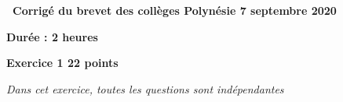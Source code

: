 \documentclass[10pt]{article}
\begin{document}
\setlength\parindent{0mm}
\pagestyle{fancy}
\thispagestyle{empty}
\begin{center}
    
{\Large \textbf{\decofourleft~Corrigé du brevet des collèges Polynésie 7 septembre 2020~\decofourright}}
    
\bigskip
    
\textbf{Durée : 2 heures} \end{center}

%

\vspace{0.5cm}

\textbf{Exercice 1 \hfill 22 points}

\medskip

\emph{Dans cet exercice, toutes les questions sont indépendantes}

\medskip
\end{document}
